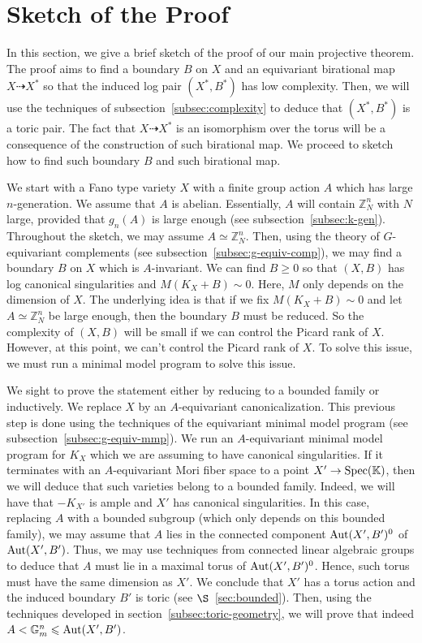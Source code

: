\documentclass{amsart}
\newcommand{\zz}{\mathbb{Z}}
\newcommand{\kk}{\mathbb{K}}
\theoremstyle{remark}
\numberwithin{equation}{section}
\begin{document}
\section{Sketch of the Proof}
In this section, we give a brief sketch of the proof of our main projective theorem. The proof aims to find a boundary $B$ on $X$ and
an equivariant birational map 
$X\dashrightarrow X^*$ so that the induced log pair $(X^*,B^*)$ has low complexity. Then, we will use the techniques of subsection~\ref{subsec:complexity} to deduce that $(X^*,B^*)$ is a toric pair.
The fact that $X\dashrightarrow X^*$ is an isomorphism over the torus will be a consequence of the construction of such birational map.
We proceed to sketch how to find such boundary $B$ and such birational map.

We start with a Fano type variety $X$ with a finite group action $A$ which has large $n$-generation.
We assume that $A$ is abelian.
Essentially, $A$ will contain $\zz^n_N$ with $N$ large,
provided that $g_n(A)$ is large enough (see subsection~\ref{subsec:k-gen}).
Throughout the sketch, we may assume $A\simeq \zz^n_N$.
Then, using the theory of $G$-equivariant complements (see subsection~\ref{subsec:g-equiv-comp}),
we may find a boundary $B$ on $X$ which is $A$-invariant.
We can find $B\geq 0$ so
that $(X,B)$ has log canonical singularities and
$M(K_X+B)\sim 0$. Here, $M$ only depends on the dimension of $X$. 
The underlying idea is that if we fix $M(K_X+B)\sim 0$
and let $A\simeq \zz^n_N$ be large enough, then the boundary $B$ must be reduced. So the complexity of $(X,B)$ will be small
if we can control the Picard rank of $X$.
However, at this point, we can't control the Picard rank of $X$. 
To solve this issue,
we must run a minimal model program to solve this issue.

We sight to prove the statement either by reducing to a bounded family or inductively.
We replace $X$ by an $A$-equivariant canonicalization.
This previous step is done using the techniques of the equivariant minimal model program (see subsection~\ref{subsec:g-equiv-mmp}).
We run an $A$-equivariant minimal model program for $K_X$
which we are assuming to have canonical singularities.
If it terminates with an $A$-equivariant Mori fiber space to a point $X'\rightarrow {\rm Spec}(\kk)$,
then we will deduce that such varieties belong to a bounded family. Indeed, we will have that $-K_{X'}$ is ample and $X'$ has canonical singularities. In this case, replacing $A$ with a bounded subgroup (which only depends on this bounded family), we may assume that
$A$ lies in the connected component ${\rm Aut}(X',B')^0$
of ${\rm Aut}(X',B')$. 
Thus, we may use techniques from connected linear algebraic groups to deduce that $A$ must lie in a maximal torus of
${\rm Aut}(X',B')^0$.
Hence, such torus must have the same dimension as $X'$.
We conclude that
$X'$ has a torus action and the induced boundary $B'$ is toric (see $\S$~\ref{sec:bounded}).
Then, using the techniques developed in section~\ref{subsec:toric-geometry}, we will prove that
indeed $A<\mathbb{G}_m^n\leqslant {\rm Aut}(X',B')$.
\end{document}

